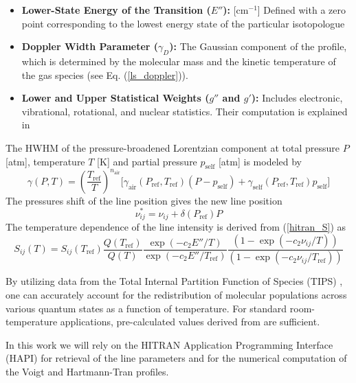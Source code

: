 \documentclass[12pt]{report}
\begin{document}
\begin{itemize}
		\item \textbf{Lower-State Energy of the Transition ($E''$):} [cm$^{-1}$] Defined with a zero point corresponding to the lowest energy state of the particular isotopologue
		\item \textbf{Doppler Width Parameter ($\gamma_D$):} The Gaussian component of the profile, which is determined by the molecular mass and the kinetic temperature of the gas species (see Eq. (\ref{ls_doppler})).
		\item \textbf{Lower and Upper Statistical Weights ($g''$ and $g'$):} Includes electronic, vibrational, rotational, and nuclear statistics. Their computation is explained in \cite{hitran_statistical_weights}
	\end{itemize}
	
	The HWHM of the pressure-broadened Lorentzian component at total pressure $P$ [atm], temperature $T$ [K] and partial pressure $p_\mathrm{self}$ [atm] is modeled by
	\begin{equation}
		\gamma(P, T) = \left(\frac{T_\mathrm{ref}}{T}\right)^{n_\mathrm{air}} \Big[
		\gamma_\mathrm{air}(P_\mathrm{ref}, T_\mathrm{ref}) \left(P - p_\mathrm{self}\right) +
		\gamma_\mathrm{self}(P_\mathrm{ref}, T_\mathrm{ref}) p_\mathrm{self}
		\Big]
	\end{equation}
	The pressures shift of the line position gives the new line position
	\begin{equation}
		\nu^*_{ij} = \nu_{ij} + \delta(P_\mathrm{ref}) P
	\end{equation}
	The temperature dependence of the line intensity is derived from (\ref{hitran_S}) as
	\begin{equation}
		S_{ij}(T) = S_{ij}(T_\mathrm{ref}) \frac{Q(T_\mathrm{ref})}{Q(T)}
		\frac{\exp\left(-c_2 E''/T\right)}{\exp\left(-c_2 E''/T_\mathrm{ref}\right)}
		\frac{\left(1 - \exp\left(-c_2 \nu_{ij}/T\right)\right)}{\left(1 - \exp\left(-c_2 \nu_{ij}/T_\mathrm{ref}\right)\right)}
	\end{equation}
	
	By utilizing data from the Total Internal Partition Function of Species (TIPS) \cite{TIPS_2021}, one can accurately account for the redistribution of molecular populations across various quantum states as a function of temperature. For standard room-temperature applications, pre-calculated values derived from \cite{TIPS_2021} are sufficient.
	
	In this work we will rely on the HITRAN Application Programming Interface (HAPI) \cite{HAPI_2016} for retrieval of the line parameters and for the numerical computation of the Voigt and Hartmann-Tran profiles.
	
\end{document}
